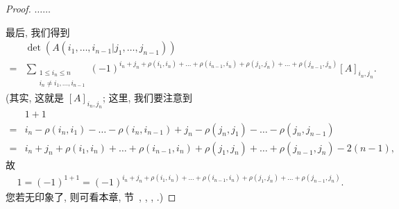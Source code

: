 \begin{proof}
    \(\dots \dots\)

    最后, 我们得到
    \begin{align*}
             &
        \det {(A({i_1,\dots,i_{n-1}}|{j_1,\dots,j_{n-1}}))}
        \\
        = {} &
        \sum_{\substack{
        1 \leq i_n \leq n \\
                i_n \neq i_1, \dots, i_{n-1}
            }}
        {(-1)^{i_n + j_n
                    + \rho(i_1, i_n) + \dots + \rho(i_{n-1}, i_n)
                    + \rho(j_1, j_n) + \dots + \rho(j_{n-1}, j_n)}
                [A]_{i_n,j_n}}.
    \end{align*}
    (其实, 这就是 \([A]_{i_n,j_n}\);
    这里, 我们要注意到
    \begin{align*}
             & 1 + 1
        \\
        = {} &
        i_n - \rho(i_n, i_1) - \dots - \rho(i_n, i_{n-1})
        + j_n - \rho(j_n, j_1) - \dots - \rho(j_n, j_{n-1})
        \\
        = {} &
        i_n + j_n
        + \rho(i_1, i_n) + \dots + \rho(i_{n-1}, i_n)
        + \rho(j_1, j_n) + \dots + \rho(j_{n-1}, j_n)
        - 2(n-1),
    \end{align*}
    故
    \begin{align*}
        1 = (-1)^{1+1}
        = (-1)^{i_n + j_n
                + \rho(i_1, i_n) + \dots + \rho(i_{n-1}, i_n)
                + \rho(j_1, j_n) + \dots + \rho(j_{n-1}, j_n)}.
    \end{align*}
    您若无印象了, 则可看本章, 节~,
    ,
    ,
    .)


\end{proof}
